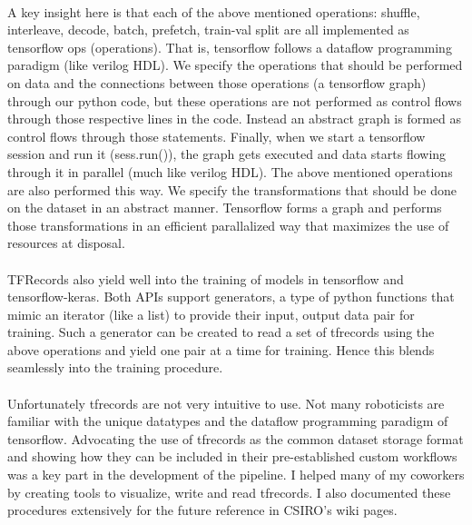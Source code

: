 \paragraph{}
A key insight here is that each of the above mentioned operations: shuffle, interleave, decode, batch, prefetch, train-val split are all implemented as tensorflow ops (operations). That is, tensorflow follows a dataflow programming paradigm (like verilog HDL). We specify the operations that should be performed on data and the connections between those operations (a tensorflow graph) through our python code, but these operations are not performed as control flows through those respective lines in the code. Instead an abstract graph is formed as control flows through those statements. Finally, when we start a tensorflow session and run it (sess.run()), the graph gets executed and data starts flowing through it in parallel (much like verilog HDL). The above mentioned operations are also performed this way. We specify the transformations that should be done on the dataset in an abstract manner. Tensorflow forms a graph and performs those transformations in an efficient parallalized way that maximizes the use of resources at disposal.

\paragraph{}
TFRecords also yield well into the training of models in tensorflow and tensorflow-keras. Both APIs support generators, a type of python functions that mimic an iterator (like a list) to provide their input, output data pair for training. Such a generator can be created to read a set of tfrecords using the above operations and yield one pair at a time for training. Hence this blends seamlessly into the training procedure. 


\paragraph{}
Unfortunately tfrecords are not very intuitive to use. Not many roboticists are familiar with the unique datatypes and the dataflow programming paradigm of tensorflow. Advocating the use of tfrecords as the common dataset storage format and showing how they can be included in their pre-established custom workflows was a key part in the development of the pipeline. I helped many of my coworkers by creating tools to visualize, write and read tfrecords. I also documented these procedures extensively for the future reference in CSIRO's wiki pages.


